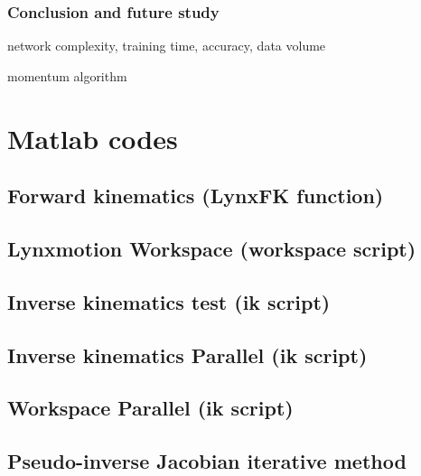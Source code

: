 \documentclass{article}
\begin{document}
\subsubsection{Conclusion and future study}
network complexity, training time, accuracy, data volume 

momentum algorithm
















\appendix
\section{Matlab codes}
\subsection{Forward kinematics (LynxFK function)}
\label{apendix:LynxFK}


\subsection{Lynxmotion Workspace (workspace script)}
\label{apendix:lynx_workspace}


\subsection{Inverse kinematics test (ik script)}
\label{apendix:lynx_ik_test}


\subsection{Inverse kinematics Parallel (ik script)}
\label{apendix:parallel_ik_test}


\subsection{Workspace Parallel (ik script)}
\label{apendix:parallel_workspace}


\subsection{Pseudo-inverse Jacobian iterative method}
\label{apendix:iterative_method}




\end{document}
